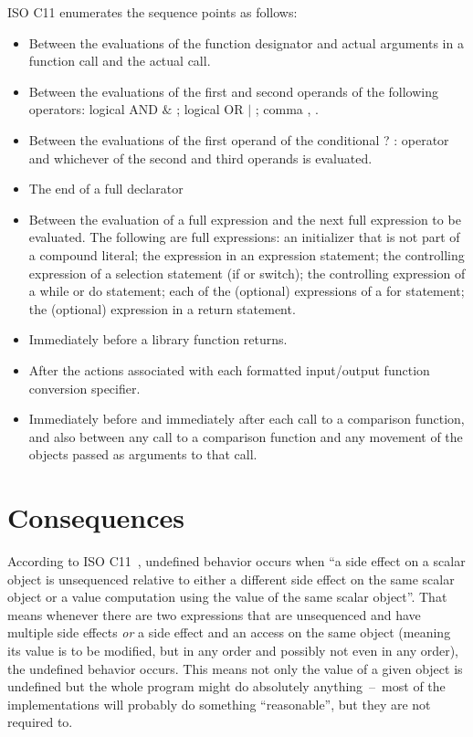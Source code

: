 ISO C11 enumerates the sequence points as follows:~\cite{WG14N1570}
\begin{itemize}
    \item Between the evaluations of the function designator and actual arguments in a function call and the actual call.
    \item Between the evaluations of the first and second operands of the following operators: logical AND $\&$ ; logical OR $|$ ; comma , .
    \item Between the evaluations of the first operand of the conditional ? : operator and whichever of the second and third operands is evaluated.
    \item The end of a full declarator
    \item Between the evaluation of a full expression and the next full expression to be evaluated. The following are full expressions: an initializer that is not part of a compound literal; the expression in an expression statement; the
controlling expression of a selection statement (if or switch); the controlling expression of a while or do statement; each of the (optional) expressions of a for statement; the (optional) expression in a return statement.
    \item Immediately before a library function returns.
    \item After the actions associated with each formatted input/output function conversion specifier.
    \item Immediately before and immediately after each call to a comparison function, and also between any call to a comparison function and any movement of the objects passed as arguments to that call.
\end{itemize}

\section{Consequences}%
According to ISO C11~\cite{WG14N1570}, undefined behavior occurs when ``a side effect on a scalar object is unsequenced relative to either a different side effect on the same scalar object or a value computation using the value of the same scalar object''. That means whenever there are two expressions that are unsequenced and have multiple side effects \emph{or} a side effect and an access on the same object (meaning its value is to be modified, but in any order and possibly not even in any order), the undefined behavior occurs. This means not only the value of a given object is undefined but the whole program might do absolutely anything~--~most of the implementations will probably do something ``reasonable'', but they are not required to.


